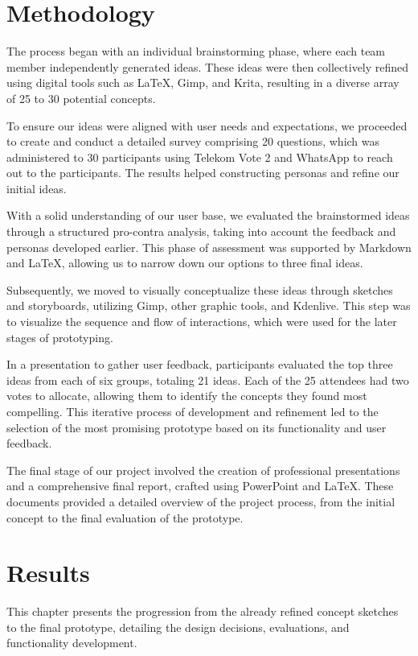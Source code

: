 \documentclass{article}
\begin{document}
\section{Methodology}
The process began with an individual brainstorming phase,
where each team member independently generated ideas.
These ideas were then collectively refined using digital tools such as LaTeX, Gimp, and Krita,
resulting in a diverse array of 25 to 30 potential concepts.

To ensure our ideas were aligned with user needs and expectations,
we proceeded to create and conduct a detailed survey comprising 20 questions,
which was administered to 30 participants using Telekom Vote 2 and WhatsApp to reach out to the participants.
The results helped constructing personas and refine our initial ideas.

With a solid understanding of our user base,
we evaluated the brainstormed ideas through a structured pro-contra analysis,
taking into account the feedback and personas developed earlier.
This phase of assessment was supported by Markdown and LaTeX,
allowing us to narrow down our options to three final ideas.

Subsequently, we moved to visually conceptualize these ideas through sketches and storyboards,
utilizing Gimp, other graphic tools, and Kdenlive.
This step was to visualize the sequence and flow of interactions,
which were used for the later stages of prototyping.

In a presentation to gather user feedback,
participants evaluated the top three ideas from each of six groups, totaling 21 ideas.
Each of the 25 attendees had two votes to allocate,
allowing them to identify the concepts they found most compelling.
This iterative process of development and refinement led to the selection
of the most promising prototype based on its functionality and user feedback.

The final stage of our project involved the creation of professional presentations and a comprehensive final report,
crafted using PowerPoint and LaTeX. These documents provided a detailed overview of the project process,
from the initial concept to the final evaluation of the prototype.

\section{Results}
This chapter presents the progression from the already refined concept sketches to the final prototype,
detailing the design decisions, evaluations, and functionality development.
\end{document}

